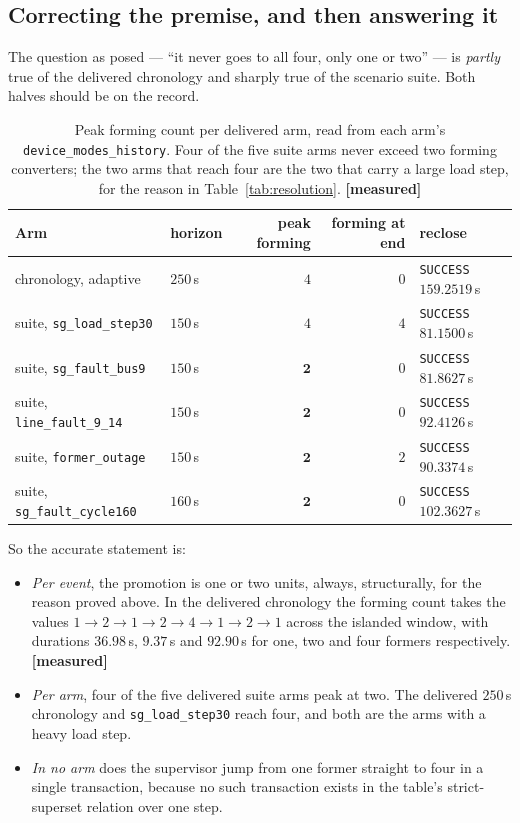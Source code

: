 \documentclass[12pt,a4paper]{article}
\theoremstyle{remark}
\newcommand{\code}[1]{\texttt{\small #1}}
\newcommand{\measured}{\textcolor{ok}{\textbf{[measured]}}}
\begin{document}
\subsection{Correcting the premise, and then answering it}

The question as posed --- ``it never goes to all four, only one or two'' --- is
\emph{partly} true of the delivered chronology and sharply true of the scenario
suite. Both halves should be on the record.

\begin{table}[H]
\centering
\small
\begin{tabular}{@{}llrrl@{}}
\toprule
\textbf{Arm} & \textbf{horizon} & \textbf{peak forming} & \textbf{forming at end} & \textbf{reclose}\\
\midrule
chronology, adaptive      & $250$\,s & $4$ & $0$ & \code{SUCCESS} $159.2519$\,s\\
suite, \code{sg\_load\_step30}  & $150$\,s & $4$ & $4$ & \code{SUCCESS} $81.1500$\,s\\
suite, \code{sg\_fault\_bus9}   & $150$\,s & $\mathbf{2}$ & $0$ & \code{SUCCESS} $81.8627$\,s\\
suite, \code{line\_fault\_9\_14}& $150$\,s & $\mathbf{2}$ & $0$ & \code{SUCCESS} $92.4126$\,s\\
suite, \code{former\_outage}    & $150$\,s & $\mathbf{2}$ & $2$ & \code{SUCCESS} $90.3374$\,s\\
suite, \code{sg\_fault\_cycle160}& $160$\,s & $\mathbf{2}$ & $0$ & \code{SUCCESS} $102.3627$\,s\\
\bottomrule
\end{tabular}
\caption{Peak forming count per delivered arm, read from each arm's
\code{device\_modes\_history}. Four of the five suite arms never exceed two
forming converters; the two arms that reach four are the two that carry a large
load step, for the reason in Table~\ref{tab:resolution}. \measured}
\label{tab:arms}
\end{table}

So the accurate statement is:

\begin{itemize}[leftmargin=1.4em,itemsep=2pt]
\item \emph{Per event}, the promotion is one or two units, always, structurally,
      for the reason proved above. In the delivered chronology the forming count
      takes the values $1 \to 2 \to 1 \to 2 \to 4 \to 1 \to 2 \to 1$ across the
      islanded window, with durations $36.98$\,s, $9.37$\,s and $92.90$\,s for
      one, two and four formers respectively. \measured
\item \emph{Per arm}, four of the five delivered suite arms peak at two. The
      delivered $250$\,s chronology and \code{sg\_load\_step30} reach four, and
      both are the arms with a heavy load step.
\item \emph{In no arm} does the supervisor jump from one former straight to four
      in a single transaction, because no such transaction exists in the table's
      strict-superset relation over one step.
\end{itemize}
\end{document}
